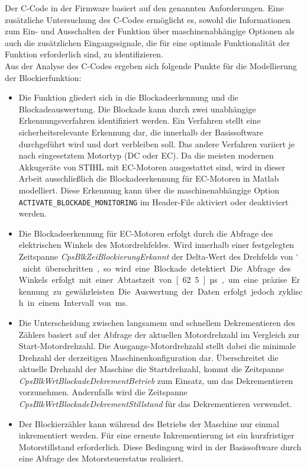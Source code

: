 Der C-Code in der Firmware basiert auf den genannten Anforderungen. Eine zusätzliche Untersuchung des C-Codes ermöglicht es, sowohl die Informationen zum Ein- und Ausschalten der Funktion über maschinenabhängige Optionen als auch die zusätzlichen Eingangssignale, die für eine optimale Funktionalität der Funktion erforderlich sind, zu identifizieren. \\
Aus der Analyse des C-Codes \cite{Firmware_gesamt} ergeben sich folgende Punkte für die Modellierung der Blockierfunktion:
\begin{itemize}
\item Die Funktion gliedert sich in die Blockadeerkennung und die Blockadeauswertung. Die Blockade kann durch zwei unabhängige Erkennungsverfahren identifiziert werden. Ein Verfahren stellt eine sicherheitsrelevante Erkennung dar, die innerhalb der Basissoftware durchgeführt wird und dort verbleiben soll. Das andere Verfahren variiert je nach eingesetztem Motortyp (DC oder EC). Da die meisten modernen Akkugeräte von STIHL mit EC-Motoren ausgestattet sind, wird in dieser Arbeit ausschließlich die Blockadeerkennung für EC-Motoren in Matlab modelliert. Diese Erkennung kann über die maschinenabhängige Option \lstinline{ACTIVATE_BLOCKADE_MONITORING} im Header-File aktiviert oder deaktiviert werden.

\item Die Blockadeerkennung für EC-Motoren erfolgt durch die Abfrage des elektrischen Winkels des Motordrehfeldes. Wird innerhalb einer festgelegten Zeitspanne \textit{CpsBlkZeiBlockierungErkannt} der Delta-Wert des Drehfelds von \unit[60]{$^\circ$} nicht überschritten, so wird eine Blockade detektiert. Die Abfrage des Winkels erfolgt mit einer Abtastzeit von \unit[62.5]{µs}, um eine präzise Erkennung zu gewährleisten. Die Auswertung der Daten erfolgt jedoch zyklisch in einem Intervall von \unit[1]{ms}.

\item Die Unterscheidung zwischen langsamem und schnellem Dekrementieren des Zählers basiert auf der Abfrage der aktuellen Motordrehzahl im Vergleich zur Start-Motordrehzahl. Die Ausgangs-Motordrehzahl stellt dabei die minimale Drehzahl der derzeitigen Maschinenkonfiguration dar. Überschreitet die aktuelle Drehzahl der Maschine die Startdrehzahl, kommt die Zeitspanne \textit{CpsBlkWrtBlockadeDekrementBetrieb} zum Einsatz, um das Dekrementieren vorzunehmen. Andernfalls wird die Zeitspanne \textit{CpsBlkWrtBlockadeDekrementStillstand} für das Dekrementieren verwendet.

\item Der Blockierzähler kann während des Betriebs der Maschine nur einmal inkrementiert werden. Für eine erneute Inkrementierung ist ein kurzfristiger Motorstillstand erforderlich. Diese Bedingung wird in der Basissoftware durch eine Abfrage des Motorsteuerstatus realisiert.

\end{itemize}

